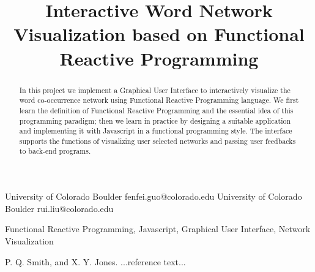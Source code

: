 \documentclass[]{sigplanconf}
\begin{document}
\setlength{\pdfpageheight}{\paperheight}
\setlength{\pdfpagewidth}{\paperwidth}




\title{Interactive Word Network Visualization based on Functional Reactive Programming}

           {University of Colorado Boulder}
           {fenfei.guo@colorado.edu}
           {University of Colorado Boulder}
           {rui.liu@colorado.edu}

\maketitle

\begin{abstract}
In this project we implement a Graphical User Interface to interactively visualize the word co-occurrence network using Functional Reactive Programming language. We first learn the definition of Functional Reactive Programming and the essential idea of this programming paradigm; then we learn in practice by designing a suitable application and implementing it with Javascript in a functional programming style. The interface supports the functions of visualizing user selected networks and passing user feedbacks to back-end programs. 
\end{abstract}


\keywords
Functional Reactive Programming, Javascript, Graphical User Interface, Network Visualization






















\begin{thebibliography}{}
\softraggedright

P. Q. Smith, and X. Y. Jones. ...reference text...

\end{thebibliography}
\end{document}
